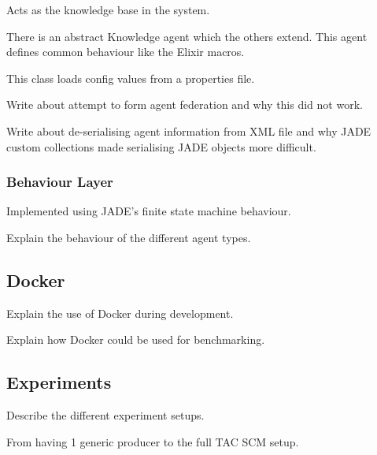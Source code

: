 Acts as the knowledge base in the system.

There is an abstract Knowledge agent which the others extend.
This agent defines common behaviour like the Elixir macros.

This class loads config values from a properties file.

Write about attempt to form agent federation and why this did not work.

Write about de-serialising agent information from XML file and why JADE custom collections made serialising JADE objects more difficult.

\subsubsection{Behaviour Layer}

Implemented using JADE's finite state machine behaviour.

Explain the behaviour of the different agent types.

\subsection{Docker}

Explain the use of Docker during development.

Explain how Docker could be used for benchmarking.



\subsection{Experiments}

Describe the different experiment setups.

From having 1 generic producer to the full TAC SCM setup.
